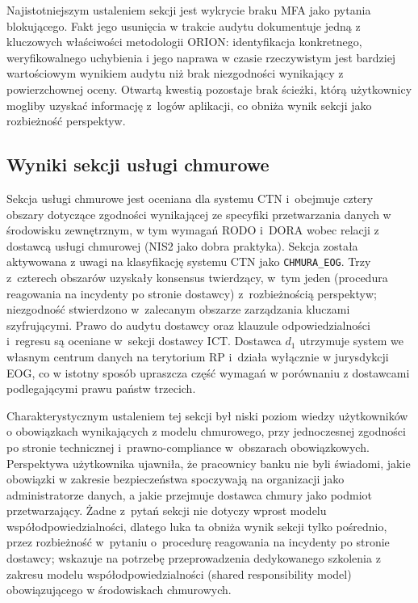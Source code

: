 Najistotniejszym ustaleniem sekcji jest wykrycie braku MFA jako pytania blokującego. Fakt jego usunięcia w trakcie audytu dokumentuje jedną z kluczowych właściwości metodologii ORION: identyfikacja konkretnego, weryfikowalnego uchybienia i jego naprawa w czasie rzeczywistym jest bardziej wartościowym wynikiem audytu niż brak niezgodności wynikający z powierzchownej oceny. Otwartą kwestią pozostaje brak ścieżki, którą użytkownicy mogliby uzyskać informację z~logów aplikacji, co obniża wynik sekcji jako rozbieżność perspektyw.

\subsection{Wyniki sekcji usługi chmurowe}

Sekcja usługi chmurowe jest oceniana dla systemu CTN i~obejmuje cztery obszary dotyczące zgodności wynikającej ze specyfiki przetwarzania danych w środowisku zewnętrznym, w tym wymagań RODO i~DORA wobec relacji z dostawcą usługi chmurowej (NIS2 jako dobra praktyka). Sekcja została aktywowana z uwagi na klasyfikację systemu CTN jako \texttt{CHMURA\_EOG}. Trzy z~czterech obszarów uzyskały konsensus twierdzący, w~tym jeden (procedura reagowania na incydenty po stronie dostawcy) z~rozbieżnością perspektyw; niezgodność stwierdzono w~zalecanym obszarze zarządzania kluczami szyfrującymi. Prawo do audytu dostawcy oraz klauzule odpowiedzialności i~regresu są oceniane w~sekcji dostawcy ICT. Dostawca $d_1$ utrzymuje system we własnym centrum danych na terytorium RP i~działa wyłącznie w jurysdykcji EOG, co w istotny sposób upraszcza część wymagań w porównaniu z dostawcami podlegającymi prawu państw trzecich.

Charakterystycznym ustaleniem tej sekcji był niski poziom wiedzy użytkowników o obowiązkach wynikających z modelu chmurowego, przy jednoczesnej zgodności po stronie technicznej i~prawno-compliance w~obszarach obowiązkowych. Perspektywa użytkownika ujawniła, że pracownicy banku nie byli świadomi, jakie obowiązki w zakresie bezpieczeństwa spoczywają na organizacji jako administratorze danych, a jakie przejmuje dostawca chmury jako podmiot przetwarzający. Żadne z~pytań sekcji nie dotyczy wprost modelu współodpowiedzialności, dlatego luka ta obniża wynik sekcji tylko pośrednio, przez rozbieżność w~pytaniu o~procedurę reagowania na incydenty po stronie dostawcy; wskazuje na potrzebę przeprowadzenia dedykowanego szkolenia z zakresu modelu współodpowiedzialności (shared responsibility model) obowiązującego w środowiskach chmurowych.

